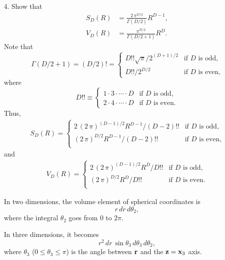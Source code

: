 \documentclass{book}
\begin{document}
4. Show that
\begin{align}
  S_D(R) &= \frac{ 2 \, \pi^{D/2} } { \Gamma(D/2) } R^{D-1},
  \label{eq:SD} \\
  V_D(R) &= \frac { \pi^{D/2} } { \Gamma(D/2+1) } R^D.
  \label{eq:VD}
\end{align}
Note that
\begin{equation}
  \Gamma\left( D/2 + 1 \right)
= \left( D/2 \right)!
=
\begin{cases}
  D!! \sqrt{\pi} / 2^{(D+1)/2}  & \mbox{if $D$ is odd,} \\
  D!! / 2^{D/2}                 & \mbox{if $D$ is even,}
\end{cases}
\label{eq:doublefactorial}
\end{equation}
where
\begin{equation}
  D!!
\equiv
\begin{cases}
  1 \cdot 3 \cdot \cdots \cdot D  & \mbox{if $D$ is odd,} \\
  2 \cdot 4 \cdot \cdots \cdot D  & \mbox{if $D$ is even.}
\end{cases}
\end{equation}
%
Thus,
\begin{align}
  S_D(R)
=
\begin{cases}
  2 \, (2 \, \pi)^{(D-1)/2} R^{D-1} / (D-2)!!  & \mbox{if $D$ is odd,} \\
       (2 \, \pi)^{D/2} R^{D-1} / (D-2)!!      & \mbox{if $D$ is even,} \\
\end{cases}
\label{eq:SDoe}
\end{align}
and
\begin{align}
  V_D(R)
=
\begin{cases}
  2 \, (2 \, \pi)^{(D-1)/2} R^D / D!!  & \mbox{if $D$ is odd,} \\
       (2 \, \pi)^{D/2} R^D / D!!      & \mbox{if $D$ is even.} \\
\end{cases}
\label{eq:VDoe}
\end{align}






In two dimensions, the volume element of spherical coordinates is
\[
  r \, dr \, d\theta_2,
\]
where the integral $\theta_2$ goes from $0$ to $2\pi$.

In three dimensions, it becomes
\[
  r^2 \, dr \,
  \sin \theta_3 \, d \theta_3 \,
  d \theta_2,
\]
where $\theta_3$ ($0 \le \theta_3 \le \pi$)
is the angle between $\boldsymbol{\mathbf{r}}$ and the $\boldsymbol{\mathbf{z}} = \boldsymbol{\mathbf{x}}_3$ axis.
\end{document}
